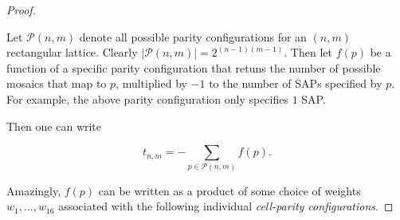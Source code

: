 \documentclass[12pt]{article}
\theoremstyle{plain}
\theoremstyle{definition}
\theoremstyle{remark}
\theoremstyle{definition}
\begin{document}
\begin{proof}
\begin{center}
\end{center}

Let $\mathcal{P} (n,m)$ denote all possible parity configurations for an $(n,m)$ rectangular lattice. Clearly $|\mathcal{P} (n,m)| = 2^{(n-1)(m-1)}$. Then let $f(p)$ be a function of a specific parity configuration that retuns the number of possible mosaics that map to $p$, multiplied by $-1$ to the number of SAPs specified by $p$. For example, the above parity configuration only specifies $1$ SAP. 

Then one can write

$$t_{n,m} = -\sum_{p \in \mathcal{P}(n,m)}f(p).$$

Amazingly, $f(p)$ can be written as a product of some choice of weights $w_{1} , \dots, w_{16}$ associated with the following individual \textit{cell-parity configurations}.


\end{proof}
\end{document}

